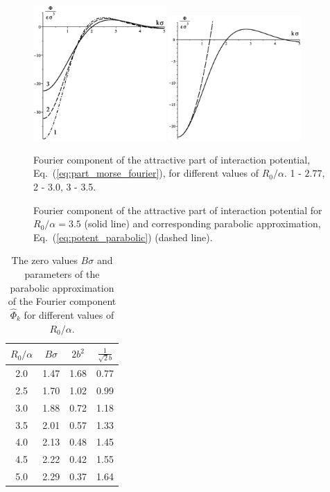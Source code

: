 \begin{figure}[htbp]
	\includegraphics[width=0.45\textwidth,angle=0]{fourier_for_different_parameter_values} \hfill
	\includegraphics[width=0.45\textwidth,angle=0]{fourier_and_parabolic_potential} \\
	\parbox{0.5\textwidth}{\caption{\label{fig:fourier_for_some_parameter_values} Fourier component of the attractive part of interaction potential, Eq.~(\ref{eq:part_morse_fourier}), for different values of $R_0/\alpha$. 1 - $2.77$, 2 - 3.0, 3 - 3.5.
	}} \hfill
	\parbox{0.45\textwidth}{\caption{\label{fig:fourier_and_parabolic} Fourier component of the attractive part of interaction potential for $R_0/\alpha=3.5$  (solid line) and corresponding parabolic approximation, Eq.~(\ref{eq:potent_parabolic}) (dashed line).
	}}
\end{figure}

\begin{table}[h]
	\caption{The zero values $B\sigma$ and parameters of the parabolic approximation of the Fourier component $\hat{\Phi}_{k}$ for different values of $R_0/\alpha$.}
	\label{tab:potential_fourier_zeros}
	\begin{center}
		\begin{tabular}{|c|c|c|c|}
			\hline
			$R_0/\alpha$ \quad & $B\sigma$ \quad & $2b^2$ \quad & $ \frac{1}{\sqrt{2}b}$ \quad \\
			\hline
			2.0  & 1.47 & 1.68 & 0.77 \\
			2.5  & 1.70 & 1.02 & 0.99 \\
			3.0  & 1.88 & 0.72 & 1.18 \\
			3.5  & 2.01 & 0.57 & 1.33 \\
			4.0  & 2.13 & 0.48 & 1.45 \\
			4.5  & 2.22 & 0.42 & 1.55 \\
			5.0  & 2.29 & 0.37 & 1.64 \\
			\hline
		\end{tabular}
	\end{center}
\end{table}

